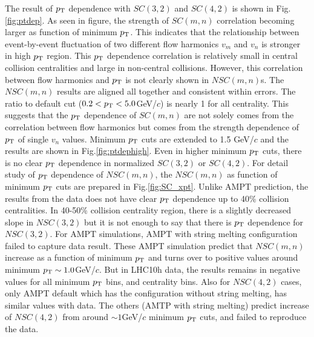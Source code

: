 The result of $p_{\rm{T}}$ dependence with $SC(3,2)$ and $SC(4,2)$ is shown in Fig.\ref{fig:ptdep}. As seen in figure, the strength of $SC(m,n)$ correlation becoming larger as function of minimum $p_{\rm{T}}$. This indicates that the relationship between event-by-event fluctuation of two different flow harmonics $v_m$ and $v_n$ is stronger in high $p_{\rm{T}}$ region. This $p_{\rm{T}}$ dependence correlation is relatively small in central collision centralities and large in non-central collisions. However, this correlation between flow harmonics and $p_{\rm{T}}$ is not clearly shown in $NSC(m,n)$s. The  $NSC(m,n)$ results are aligned all together and consistent within errors. The ratio to default cut ($0.2 < p_{\rm{T}} < 5.0$GeV/$c$) is nearly 1 for all centrality. This suggests that the $p_{\rm{T}}$ dependence of $SC(m,n)$ are not solely comes from the correlation between flow harmonics but comes from the strength dependence of $p_{\rm{T}}$ of single $v_n$ values. Minimum $p_{\rm{T}}$ cuts are extended to 1.5 GeV/$c$ and the results are shown in Fig.\ref{fig:ptdephigh}. Even in higher minimum $p_{\rm{T}}$ cuts, there is no clear $p_{\rm{T}}$ dependence in normalized $SC(3,2)$ or $SC(4,2)$. For detail study of $p_{\rm{T}}$ dependence of  $NSC(m,n)$, the $NSC(m,n)$ as function of minimum $p_{\rm{T}}$ cuts are prepared in Fig.\ref{fig:SC_xpt}. Unlike AMPT prediction, the results from the data does not have clear $p_{\rm{T}}$ dependence up to 40\% collision centralities. In 40-50\% collision centrality region, there is a slightly decreased slope in $NSC(3,2)$ but it is not enough to say that there is $p_{\rm{T}}$ dependence for $NSC(3,2)$. For AMPT simulations, AMPT with string melting configuration failed to capture data result. These AMPT simulation predict that  $NSC(m,n)$ increase as a function of minimum $p_{\rm{T}}$ and turns over to positive values around minimum $p_{\rm{T}} \sim 1.0$GeV/$c$. But in LHC10h data, the results remains in negative values for all minimum $p_{\rm{T}}$ bins, and centrality bins. Also for $NSC(4,2)$ cases, only AMPT default which has the configuration without string melting, has similar values with data. The others (AMTP with string melting) predict increase of $NSC(4,2)$ from around $\sim 1$GeV/$c$ minimum $p_{\rm{T}}$ cuts, and failed to reproduce the data.

